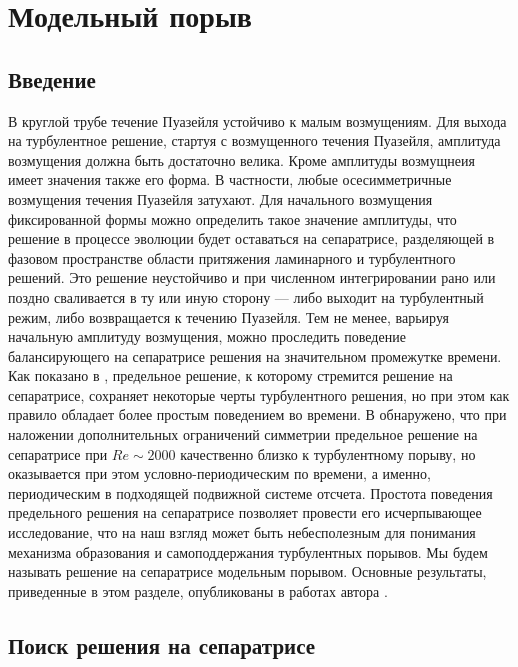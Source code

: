 
\chapter{Модельный порыв}

\section{Введение} 


В круглой трубе течение Пуазейля устойчиво к малым возмущениям. Для выхода на турбулентное решение, стартуя с возмущенного течения Пуазейля, амплитуда возмущения должна быть достаточно велика. Кроме амплитуды возмущнеия имеет значения также его форма. В частности, любые осесимметричные возмущения течения Пуазейля затухают. Для начального возмущения фиксированной формы можно определить такое значение амплитуды, что решение в процессе эволюции будет оставаться на сепаратрисе, разделяющей в фазовом пространстве области притяжения ламинарного и турбулентного решений. Это решение неустойчиво и при численном интегрировании рано или поздно сваливается в ту или иную сторону --- либо выходит на турбулентный режим, либо возвращается к течению Пуазейля. Тем не менее, варьируя начальную амплитуду возмущения, можно проследить поведение балансирующего на сепаратрисе решения на значительном промежутке времени. Как показано в \cite{Skufca2006}, предельное решение, к которому стремится решение на сепаратрисе, сохраняет некоторые черты турбулентного решения, но при этом как правило обладает более простым поведением во времени. В \cite{Avila2013} обнаружено, что при наложении дополнительных ограничений симметрии предельное решение на сепаратрисе при $Re\sim2000$ качественно близко к турбулентному порыву, но оказывается при этом условно-периодическим по времени, а именно, периодическим в подходящей подвижной системе отсчета. Простота поведения предельного решения на сепаратрисе позволяет провести его исчерпывающее исследование, что на наш взгляд может быть небесполезным для понимания  механизма образования и самоподдержания турбулентных порывов. Мы будем называть решение на сепаратрисе модельным порывом. Основные результаты, приведенные в этом разделе, опубликованы в работах автора \cite{MZG2015, Kazan2015, MZG2017}. 

\section{Поиск решения на сепаратрисе}

